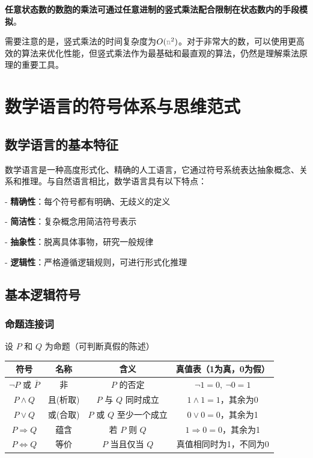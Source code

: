 \documentclass[12pt,a4paper,UTF8]{ctexart}
\newcommand{\var}[1]{\textcolor{lightgray}{\mathtt{#1}}}
\begin{document}
\textbf{任意状态数的数胞的乘法可通过任意进制的竖式乘法配合限制在状态数内的手段模拟}。

\qquad 需要注意的是，竖式乘法的时间复杂度为$O(\var{n}^2)$。对于非常大的数，可以使用更高效的算法来优化性能，但竖式乘法作为最基础和最直观的算法，仍然是理解乘法原理的重要工具。




\newpage
\section{数学语言的符号体系与思维范式}

\subsection{数学语言的基本特征}

\qquad 数学语言是一种高度形式化、精确的人工语言，它通过符号系统表达抽象概念、关系和推理。与自然语言相比，数学语言具有以下特点：

- \textbf{精确性}：每个符号都有明确、无歧义的定义

- \textbf{简洁性}：复杂概念用简洁符号表示

- \textbf{抽象性}：脱离具体事物，研究一般规律

- \textbf{逻辑性}：严格遵循逻辑规则，可进行形式化推理

\subsection{基本逻辑符号}

\subsubsection{命题连接词}

设 $P$ 和 $Q$ 为命题（可判断真假的陈述）

\begin{table}[ht]
\centering
\begin{tabular}{|c|c|c|c|}
\hline
符号 & 名称 & 含义 & 真值表（1为真，0为假） \\
\hline
$\neg P$ 或 $\overline{P}$ & 非 & $P$ 的否定 & $\neg 1 = 0,\ \neg 0 = 1$ \\
\hline
$P \land Q$ & 且(析取) & $P$ 与 $Q$ 同时成立 & $1 \land 1 = 1$，其余为0 \\
\hline
$P \lor Q$ & 或(合取) & $P$ 或 $Q$ 至少一个成立 & $0 \lor 0 = 0$，其余为1 \\
\hline
$P \Rightarrow Q$ & 蕴含 & 若 $P$ 则 $Q$ & $1 \Rightarrow 0 = 0$，其余为1 \\
\hline
$P \Leftrightarrow Q$ & 等价 & $P$ 当且仅当 $Q$ & 真值相同时为1，不同为0 \\
\hline
\end{tabular}
\end{table}
\end{document}
